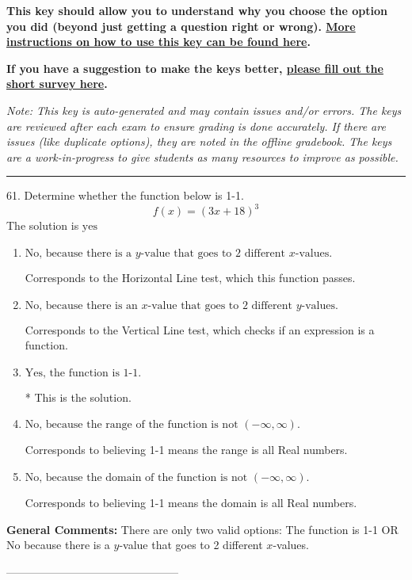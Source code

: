 \documentclass{extbook}[14pt]
\begin{document}
\textbf{This key should allow you to understand why you choose the option you did (beyond just getting a question right or wrong). \href{https://xronos.clas.ufl.edu/mac1105spring2020/courseDescriptionAndMisc/Exams/LearningFromResults}{More instructions on how to use this key can be found here}.}

\textbf{If you have a suggestion to make the keys better, \href{https://forms.gle/CZkbZmPbC9XALEE88}{please fill out the short survey here}.}

\textit{Note: This key is auto-generated and may contain issues and/or errors. The keys are reviewed after each exam to ensure grading is done accurately. If there are issues (like duplicate options), they are noted in the offline gradebook. The keys are a work-in-progress to give students as many resources to improve as possible.}

\rule{\textwidth}{0.4pt}

61. Determine whether the function below is 1-1.
\[ f(x) = (3 x + 18)^3 \] 
The solution is $ \text{yes} $ 

\begin{enumerate}[label=\Alph*.] 
\item $ \text{No, because there is a $y$-value that goes to 2 different $x$-values.} $ 

 Corresponds to the Horizontal Line test, which this function passes. 
\item $ \text{No, because there is an $x$-value that goes to 2 different $y$-values.} $ 

 Corresponds to the Vertical Line test, which checks if an expression is a function. 
\item $ \text{Yes, the function is 1-1.} $ 

 * This is the solution. 
\item $ \text{No, because the range of the function is not $(-\infty, \infty)$.} $ 

 Corresponds to believing 1-1 means the range is all Real numbers. 
\item $ \text{No, because the domain of the function is not $(-\infty, \infty)$.} $ 

 Corresponds to believing 1-1 means the domain is all Real numbers. 
\end{enumerate} 
 
\textbf{General Comments:} There are only two valid options: The function is 1-1 OR No because there is a $y$-value that goes to 2 different $x$-values.

-----------------------------------------------
\end{document}
